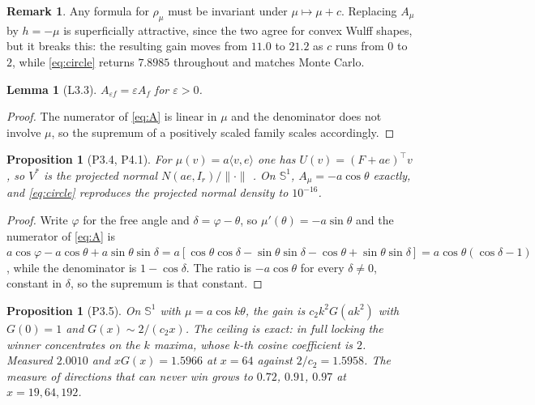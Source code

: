 \documentclass[11pt]{article}
\newtheorem{proposition}[theorem]{Proposition}
\newtheorem{lemma}[theorem]{Lemma}
\theoremstyle{definition}
\newtheorem{remark}[theorem]{Remark}
\newcommand{\Sph}{\mathbb{S}}
\begin{document}
\begin{remark}
Any formula for $\rho_{\mu}$ must be invariant under $\mu\mapsto\mu+c$.
Replacing $A_{\mu}$ by $h=-\mu$ is superficially attractive, since the two
agree for convex Wulff shapes, but it breaks this: the resulting gain moves from
$11.0$ to $21.2$ as $c$ runs from $0$ to $2$, while \eqref{eq:circle} returns
$7.8985$ throughout and matches Monte Carlo.
\end{remark}

\begin{lemma}[\textsf{L3.3}]\label{lem:homog}
$A_{\varepsilon f}=\varepsilon A_{f}$ for $\varepsilon>0$.
\end{lemma}
\begin{proof}
The numerator of \eqref{eq:A} is linear in $\mu$ and the denominator does not
involve $\mu$, so the supremum of a positively scaled family scales
accordingly.
\end{proof}

\begin{proposition}[\textsf{P3.4}, \textsf{P4.1}]\label{prop:pn}
For $\mu(v)=a\langle v,e\rangle$ one has $U(v)=(F+ae)^{\top}v$, so $V^{*}$ is
the \emph{projected normal} $N(ae,I_{r})/\lVert\cdot\rVert$
\cite{Tyler,WangGelfand}. On $\Sph^{1}$, $A_{\mu}=-a\cos\theta$ exactly, and
\eqref{eq:circle} reproduces the projected normal density to $10^{-16}$.
\end{proposition}
\begin{proof}
Write $\varphi$ for the free angle and $\delta=\varphi-\theta$, so
$\mu'(\theta)=-a\sin\theta$ and the numerator of \eqref{eq:A} is
$a\cos\varphi-a\cos\theta+a\sin\theta\sin\delta
=a[\cos\theta\cos\delta-\sin\theta\sin\delta-\cos\theta+\sin\theta\sin\delta]
=a\cos\theta(\cos\delta-1)$, while the denominator is $1-\cos\delta$. The
ratio is $-a\cos\theta$ for every $\delta\ne0$, constant in $\delta$, so the
supremum is that constant.
\end{proof}

\begin{proposition}[\textsf{P3.5}]\label{prop:G}
On $\Sph^{1}$ with $\mu=a\cos k\theta$, the gain is $c_{2}k^{2}G(ak^{2})$ with
$G(0)=1$ and $G(x)\sim2/(c_{2}x)$. The ceiling is exact: in full locking the
winner concentrates on the $k$ maxima, whose $k$-th cosine coefficient is $2$.
Measured $2.0010$ and $xG(x)=1.5966$ at $x=64$ against $2/c_{2}=1.5958$. The
measure of directions that can never win grows to $0.72$, $0.91$, $0.97$ at
$x=19,64,192$.
\end{proposition}
\end{document}
